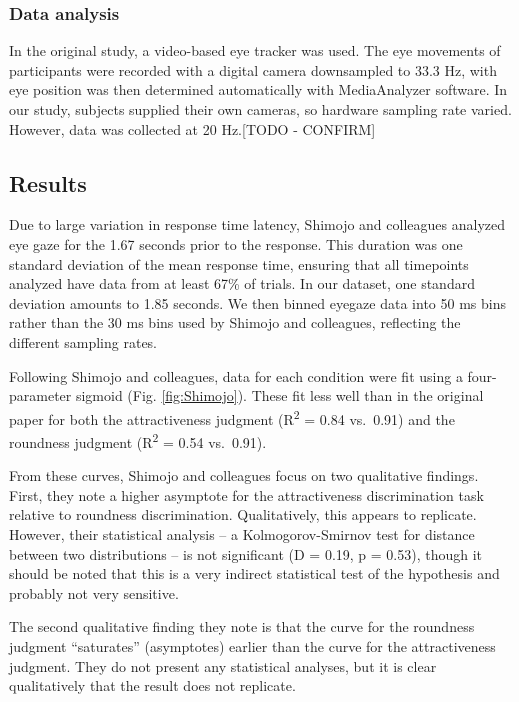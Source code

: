 \documentclass[
  man,floatsintext]{apa6}
\begin{document}
\hypertarget{data-analysis}{%
\subsubsection{Data analysis}\label{data-analysis}}

In the original study, a video-based eye tracker was used. The eye
movements of participants were recorded with a digital camera
downsampled to 33.3 Hz, with eye position was then determined
automatically with MediaAnalyzer software. In our study, subjects
supplied their own cameras, so hardware sampling rate varied. However,
data was collected at 20 Hz.{[}TODO - CONFIRM{]}

\hypertarget{results-4}{%
\subsection{Results}\label{results-4}}

Due to large variation in response time latency, Shimojo and colleagues analyzed eye gaze for the 1.67 seconds prior to the response. This duration was one standard deviation of the mean response time, ensuring that all timepoints analyzed have data from at least 67\% of trials. In our dataset, one standard deviation amounts to 1.85 seconds. We then binned eyegaze data into 50 ms bins rather than the 30 ms bins used by Shimojo and colleagues, reflecting the different sampling rates.



Following Shimojo and colleagues, data for each condition were fit using a four-parameter sigmoid (Fig. \ref{fig:Shimojo}). These fit less well than in the original paper for both the attractiveness judgment (R\textsuperscript{2} = 0.84 vs.~0.91) and the roundness judgment (R\textsuperscript{2} = 0.54 vs.~0.91).

From these curves, Shimojo and colleagues focus on two qualitative findings. First, they note a higher asymptote for the attractiveness discrimination task relative to roundness discrimination. Qualitatively, this appears to replicate. However, their statistical analysis -- a Kolmogorov-Smirnov test for distance between two distributions -- is not significant (D = 0.19, p = 0.53), though it should be noted that this is a very indirect statistical test of the hypothesis and probably not very sensitive.

The second qualitative finding they note is that the curve for the roundness judgment ``saturates'' (asymptotes) earlier than the curve for the attractiveness judgment. They do not present any statistical analyses, but it is clear qualitatively that the result does not replicate.
\end{document}
